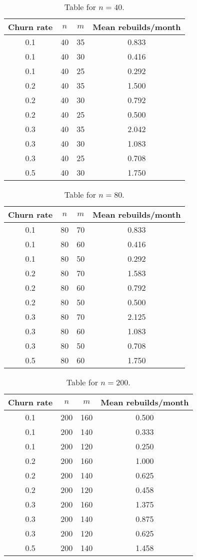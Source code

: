 \begin{table}[H]\centering


\begin{tabular}{| c | c c | c |}\hline
Churn rate & $n$ & $m$ &Mean rebuilds/month \\ \hline
0.1 & 40 & 35 & 0.833 \\  0.1 & 40 & 30 & 0.416 \\  0.1 & 40 & 25 & 0.292 \\\hline 
0.2 & 40 & 35 & 1.500 \\  0.2 & 40 & 30 & 0.792 \\  0.2 & 40 & 25 & 0.500 \\\hline 
0.3 & 40 & 35 & 2.042 \\  0.3 & 40 & 30 & 1.083 \\  0.3 & 40 & 25 & 0.708 \\\hline
0.5 & 40 & 30 & 1.750 \\ \hline
\end{tabular}
\caption{Table for $n=40$.}\label{table:n=40}
\end{table}

\begin{table}[H]\centering
\begin{tabular}{| c | c c | c |}\hline
Churn rate & $n$ & $m$ &Mean rebuilds/month \\\hline 
0.1 & 80 & 70 & 0.833 \\  0.1 & 80 & 60 & 0.416 \\  0.1 & 80 & 50 & 0.292 \\\hline 
0.2 & 80 & 70 & 1.583 \\  0.2 & 80 & 60 & 0.792 \\  0.2 & 80 & 50 & 0.500 \\\hline
0.3 & 80 & 70 & 2.125 \\  0.3 & 80 & 60 & 1.083 \\  0.3 & 80 & 50 & 0.708 \\\hline
0.5 & 80 & 60 & 1.750 \\ \hline
\end{tabular}
\caption{Table for $n=80$.}\label{table:n=80}
\end{table}

\begin{table}[H]\centering
\begin{tabular}{| c | c c | c |}\hline
Churn rate & $n$ & $m$ &Mean rebuilds/month \\\hline 
0.1 & 200 & 160 & 0.500 \\  0.1 & 200 & 140 & 0.333 \\  0.1 & 200 & 120 & 0.250 \\\hline 
0.2 & 200 & 160 & 1.000 \\  0.2 & 200 & 140 & 0.625 \\  0.2 & 200 & 120 & 0.458 \\\hline
0.3 & 200 & 160 & 1.375 \\  0.3 & 200 & 140 & 0.875 \\  0.3 & 200 & 120 & 0.625 \\\hline
0.5 & 200 & 140 & 1.458 \\\hline
\end{tabular}
\caption{Table for $n=200$.}\label{table:n=200}
\end{table}